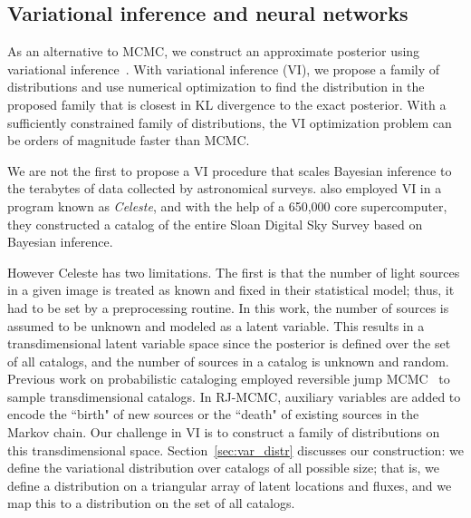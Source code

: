 \subsection{Variational inference and neural networks}
As an alternative to MCMC, we construct an approximate posterior using variational inference~\cite{Blei_2017_vi_review,Jordan_intro_vi, Wainwrite_graph_models_vi}.
With variational inference (VI), we propose a family of distributions and use numerical optimization to find the distribution 
in the proposed family that is closest 
in KL divergence to the exact posterior. 
With a sufficiently constrained family of distributions, the VI optimization problem can be orders of magnitude faster than MCMC. 

We are not the first to propose a VI procedure
that scales Bayesian inference to the terabytes of data collected by astronomical surveys. 
\cite{regier2019_celeste} also employed 
VI in a program known as {\itshape Celeste}, and with the help of a 650,000 core supercomputer, they constructed a catalog of the entire Sloan Digital Sky Survey based on Bayesian inference. 

However Celeste has two limitations. The first is that the number of light sources in a given image is treated as known and fixed in their statistical model; thus, it had to be set by a preprocessing routine. In this work, the number of sources is assumed to be unknown and modeled as a latent variable. 
This results in a transdimensional latent variable space 
since the posterior is defined over the set of all catalogs, and the number of sources in a catalog is unknown and random.
Previous work on probabilistic cataloging employed reversible jump MCMC~\cite{Green95reversiblejump} to sample transdimensional catalogs. In RJ-MCMC, auxiliary variables are added to encode the ``birth" of new sources 
or the ``death" of existing sources in the Markov chain. Our challenge in VI is to construct a family of distributions on this transdimensional space. Section~\ref{sec:var_distr} discusses our construction: we define the variational distribution over catalogs of all possible size; that is, we define a distribution on a triangular array of latent locations and fluxes, and we map this to a distribution 
on the set of all catalogs.

